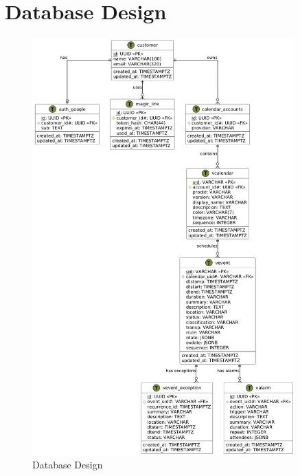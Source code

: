 \documentclass[12pt,a4paper]{report}
\begin{document}



















\section{Database Design}

\begin{figure}[!h]
    \centering
    \includegraphics[width=0.9\textwidth]{images/docs/diagrams/er/database/Database Design.png}
    \caption{Database Design}
    \label{fig:database-design}
\end{figure}
\end{document}
